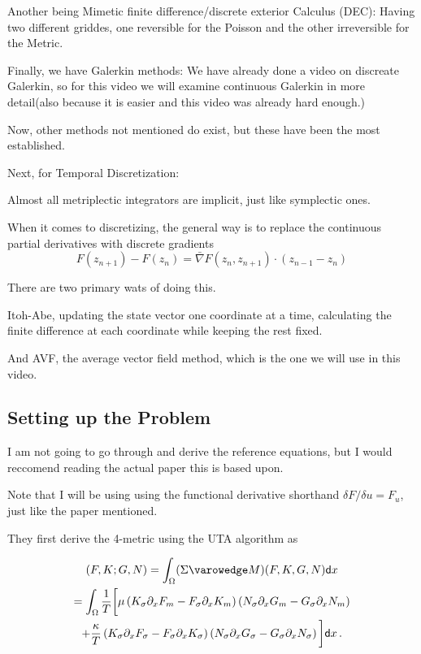   Another being Mimetic finite difference/discrete exterior Calculus (DEC): Having two different griddes, one reversible for the Poisson and the other irreversible for the Metric.


  Finally, we have Galerkin methods: We have already done a video on discreate Galerkin, so for this video we will examine continuous Galerkin in more detail(also because it is easier and this video was already hard enough.)

  Now, other methods not mentioned do exist, but these have been the most established.


  Next, for Temporal Discretization:

  Almost all metriplectic integrators are implicit, just like symplectic ones.

  When it comes to discretizing, the general way is to replace the continuous partial derivatives with discrete gradients
\[
F(z_{n+1}) - F(z_n) = \bar{\nabla} F(z_n, z_{n+1}) \cdot (z_{n-1}-z_n)
  \]

  There are two primary wats of doing this.

  Itoh-Abe, updating the state vector one coordinate at a time, calculating the finite difference at each coordinate while keeping the rest fixed.


  And AVF, the average vector field method, which is the one we will use in this video.

\subsection{Setting up the Problem}

I am not going to go through and derive the reference equations, but I would reccomend reading the actual paper this is based upon.

Note that I will be using using the functional derivative shorthand $\delta F/\delta u = F_u$, just like the paper mentioned.

They first derive the 4-metric using the UTA algorithm as

\begin{multline}
    (F, K; G, N)
    =
    \int_\Omega (\Sigma \varowedge M)(F, K, G, N) \mathsf{d} x
    \\
    =
    \int_\Omega
    \frac{1}{T}
    \bigg[
    \mu
    \left(
    K_{\sigma} \partial_x F_m
    -
    F_{\sigma} \partial_x K_{m}
    \right)
    \left(
    N_{\sigma} \partial_x G_{m}
    -
    G_{\sigma} \partial_x N_{m}
    \right) \\
    +
    \frac{\kappa}{T}
    \left(
    K_{\sigma} \partial_x F_{\sigma}
    -
    F_{\sigma} \partial_x K_{\sigma}
    \right)
    \left(
    N_{\sigma} \partial_x G_{\sigma}
    -
    G_{\sigma} \partial_x N_{\sigma}
    \right)
    \bigg]
    \mathsf{d} x \,.
\end{multline}

